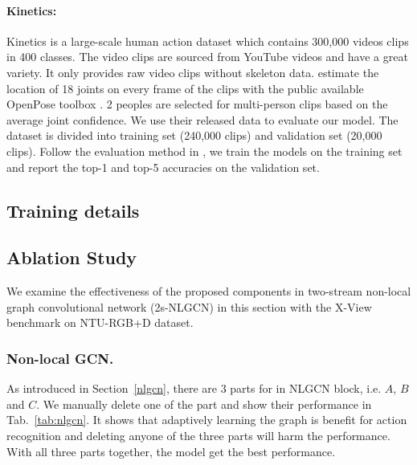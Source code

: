 \documentclass[10pt,twocolumn,letterpaper]{article}
\begin{document}
    \paragraph{Kinetics:} Kinetics \cite{kay_kinetics_2017} is a large-scale human action dataset which contains 300,000 videos clips in 400 classes. The video clips are sourced from YouTube videos and have a great variety. It only provides raw video clips without skeleton data. \cite{yan_spatial_2018} estimate the location of 18 joints on every frame of the clips with the public available OpenPose toolbox \cite{cao_realtime_2017}. 2 peoples are selected for multi-person clips based on the average joint confidence. We use their released data to evaluate our model. The dataset is divided into training set (240,000 clips) and validation set (20,000 clips). Follow the evaluation method in \cite{kay_kinetics_2017}, we train the models on the training set and report the top-1 and top-5 accuracies on the validation set.
	
    \subsection{Training details}
     






    \subsection{Ablation Study}
    \label{sec:ablation}
    We examine the effectiveness of the proposed components in two-stream non-local graph convolutional network (2s-NLGCN) in this section with the X-View benchmark on NTU-RGB+D dataset.














    \subsubsection{Non-local GCN.}
    As introduced in Section~\ref{nlgcn}, there are $3$ parts for in NLGCN block, i.e. $A$, $B$ and $C$. We manually delete one of the part and show their performance in Tab.~\ref{tab:nlgcn}. It shows that adaptively learning the graph is benefit for action recognition and deleting anyone of the three parts will harm the performance. With all three parts together, the model get the best performance.
\end{document}
